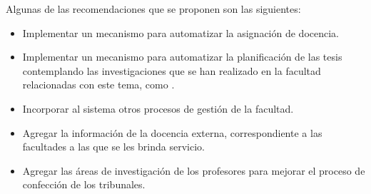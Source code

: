 \begin{conclusions}
Algunas de las recomendaciones que se proponen son las
siguientes:
\begin{itemize}
    \item Implementar un mecanismo para automatizar la asignación de docencia.
    \item Implementar un mecanismo para automatizar la planificación de las tesis contemplando 
    las investigaciones que se han realizado en la facultad relacionadas con este tema, como 
    \cite{tribunales}.
    \item Incorporar al sistema otros procesos de gestión de la facultad.
    \item Agregar la información de la docencia externa, correspondiente a las facultades a las que se les brinda servicio.
    \item Agregar las áreas de investigación de los profesores para mejorar el proceso de confección de los tribunales.
\end{itemize}

\end{conclusions}



